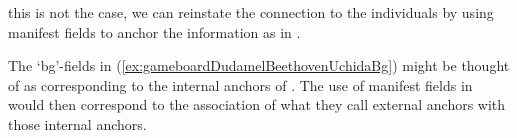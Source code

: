 this is not the case, we can reinstate the connection to the
individuals by using manifest fields to anchor the information as in
\nexteg{}.
\begin{ex} 
\end{ex} 
The `bg'-fields in (\ref{ex:gameboardDudamelBeethovenUchidaBg}) might
be thought of as corresponding to the internal anchors of
\cite{Kamp1990,KampGenabithReyle2011}.  The use of manifest fields in
\preveg{} would then correspond to the association of what they call external anchors
with those internal anchors.

